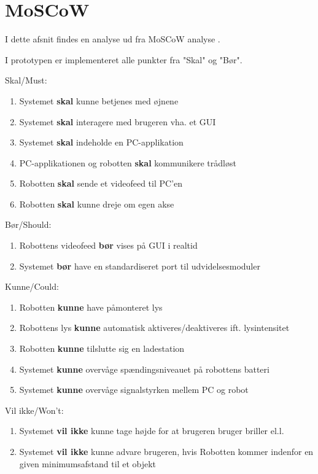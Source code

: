 \section{MoSCoW}
I dette afsnit findes en analyse ud fra MoSCoW analyse \cite{moscow}. 

I prototypen er implementeret alle punkter fra "Skal" og "Bør".

Skal/Must:
\begin{enumerate}
	\item Systemet \textbf{skal} kunne betjenes med øjnene
	\item Systemet \textbf{skal} interagere med brugeren vha. et GUI
	\item Systemet \textbf{skal} indeholde en PC-applikation
	\item PC-applikationen og robotten \textbf{skal} kommunikere trådløst
	\item Robotten \textbf{skal} sende et videofeed til PC'en
	\item Robotten \textbf{skal} kunne dreje om egen akse
\end{enumerate}
Bør/Should:
\begin{enumerate}
	\item Robottens videofeed \textbf{bør} vises på GUI i realtid
	\item Systemet \textbf{bør} have en standardiseret port til udvidelsesmoduler
\end{enumerate}
Kunne/Could:
\begin{enumerate}
	\item Robotten \textbf{kunne} have påmonteret lys
	\item Robottens lys \textbf{kunne} automatisk aktiveres/deaktiveres ift. lysintensitet
	\item Robotten \textbf{kunne} tilslutte sig en ladestation
	\item Systemet \textbf{kunne} overvåge spændingsniveauet på robottens batteri
	\item Systemet \textbf{kunne} overvåge signalstyrken mellem PC og robot
	
\end{enumerate}
Vil ikke/Won’t:
\begin{enumerate}
	\item Systemet \textbf{vil ikke} kunne tage højde for at brugeren bruger briller el.l.
	\item Systemet \textbf{vil ikke} kunne advare brugeren, hvis Robotten kommer indenfor en given minimumsafstand til et objekt
	 \newline
\end{enumerate}


